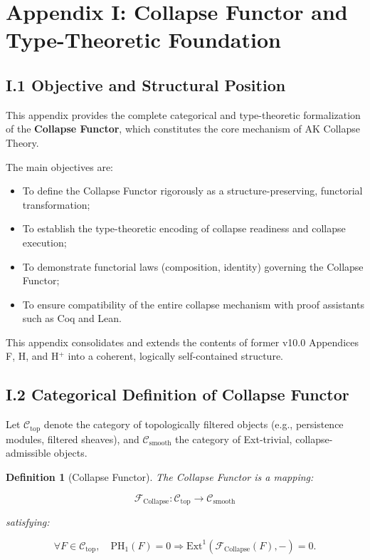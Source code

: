 \documentclass[11pt]{article}
\newtheorem{definition}[theorem]{Definition}
\begin{document}
\section*{Appendix I: Collapse Functor and Type-Theoretic Foundation}

\subsection*{I.1 Objective and Structural Position}

This appendix provides the complete categorical and type-theoretic formalization of the \textbf{Collapse Functor}, which constitutes the core mechanism of AK Collapse Theory.

The main objectives are:

\begin{itemize}
    \item To define the Collapse Functor rigorously as a structure-preserving, functorial transformation;
    \item To establish the type-theoretic encoding of collapse readiness and collapse execution;
    \item To demonstrate functorial laws (composition, identity) governing the Collapse Functor;
    \item To ensure compatibility of the entire collapse mechanism with proof assistants such as Coq and Lean.
\end{itemize}

This appendix consolidates and extends the contents of former v10.0 Appendices F, H, and H$^+$ into a coherent, logically self-contained structure.

\subsection*{I.2 Categorical Definition of Collapse Functor}

Let \( \mathcal{C}_{\mathrm{top}} \) denote the category of topologically filtered objects (e.g., persistence modules, filtered sheaves), and \( \mathcal{C}_{\mathrm{smooth}} \) the category of Ext-trivial, collapse-admissible objects.

\begin{definition}[Collapse Functor]
The \emph{Collapse Functor} is a mapping:

\[
\mathcal{F}_{\mathrm{Collapse}} : \mathcal{C}_{\mathrm{top}} \to \mathcal{C}_{\mathrm{smooth}}
\]

satisfying:

\[
\forall F \in \mathcal{C}_{\mathrm{top}}, \quad \mathrm{PH}_1(F) = 0 \Rightarrow \mathrm{Ext}^1(\mathcal{F}_{\mathrm{Collapse}}(F), -) = 0.
\]
\end{definition}
\end{document}
